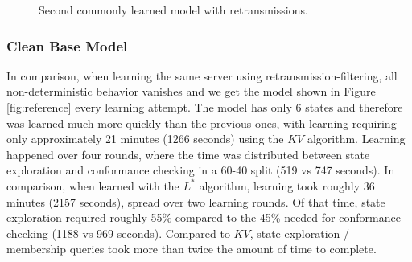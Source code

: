 \begin{figure}[ht]
	\vspace*{\fill}
	\noindent
	\hspace*{-2.1\oddsidemargin}%
	\caption{Second commonly learned model with retransmissions.}
	\label{fig:ret_case2}
	\vspace*{\fill}
\end{figure}
\newpage

\subsubsection*{Clean Base Model}

In comparison, when learning the same server using retransmission-filtering, all non-deterministic behavior vanishes and we get the model shown in Figure \ref{fig:reference} every learning attempt. The model has only 6 states and therefore was learned much more quickly than the previous ones, with learning requiring only approximately 21 minutes (1266 seconds) using the $KV$ algorithm. Learning happened over four rounds, where the time was distributed between state exploration and conformance checking in a 60-40 split (519 vs 747 seconds). In comparison, when learned with the $L^*$ algorithm, learning took roughly 36 minutes (2157 seconds), spread over two learning rounds. Of that time, state exploration required roughly 55\% compared to the 45\% needed for conformance checking (1188 vs 969 seconds). Compared to $KV$, state exploration / membership queries took more than twice the amount of time to complete.

